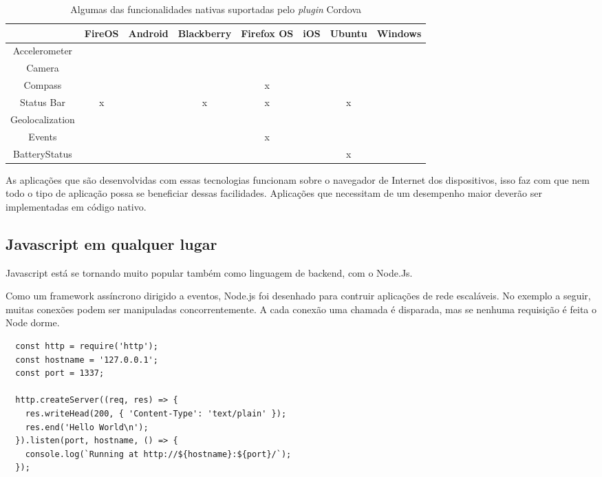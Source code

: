 \begin{table}[!htb]
	\small
	\centering
	\label{tab:cordova}
	\begin{tabular}{*8{c|}}
		 & \textbf{FireOS} & \textbf{Android} & \textbf{Blackberry} & \textbf{Firefox OS} & \textbf{iOS} & \textbf{Ubuntu} & \textbf{Windows}\\ \hline
		Accelerometer & \checkmark & \checkmark & \checkmark & \checkmark & \checkmark & \checkmark & \checkmark\\ \hline \SPACE
		Camera & \checkmark & \checkmark & \checkmark & \checkmark & \checkmark & \checkmark & \checkmark\\ \hline \SPACE
		Compass & \checkmark & \checkmark & \checkmark & x & \checkmark & \checkmark & \checkmark\\ \hline \SPACE
		Status Bar & x & \checkmark & x & x & \checkmark & x & \checkmark\\ \hline \SPACE
		Geolocalization & \checkmark & \checkmark & \checkmark & \checkmark & \checkmark & \checkmark & \checkmark\\ \hline \SPACE
		Events & \checkmark & \checkmark & \checkmark & x & \checkmark & \checkmark & \checkmark\\ \hline \SPACE
		BatteryStatus & \checkmark & \checkmark & \checkmark & \checkmark & \checkmark & x & \checkmark\\
		\hline
	\end{tabular}
	\caption[Funcionalidades nativas suportadas pelo \textit{plugin} Cordova]{Algumas das funcionalidades nativas suportadas pelo \textit{plugin} Cordova}
\end{table}

As aplicações que são desenvolvidas com essas tecnologias funcionam sobre o navegador de Internet dos dispositivos, isso faz com que nem todo o tipo de aplicação possa se beneficiar dessas facilidades. Aplicações que necessitam de um desempenho maior deverão ser implementadas em código nativo.

\subsection{Javascript em qualquer lugar}
Javascript está se tornando muito popular também como linguagem de backend, com o Node.Js.
\begin{citacao}
Como um framework assíncrono dirigido a eventos, Node.js foi desenhado para contruir aplicações de rede escaláveis. No exemplo a seguir, muitas conexões podem ser manipuladas concorrentemente. A cada conexão uma chamada é disparada, mas se nenhuma requisição é feita o Node dorme. \cite{nodejs}

\begin{verbatim}
  const http = require('http');
  const hostname = '127.0.0.1';
  const port = 1337;

  http.createServer((req, res) => {
    res.writeHead(200, { 'Content-Type': 'text/plain' });
    res.end('Hello World\n');
  }).listen(port, hostname, () => {
    console.log(`Running at http://${hostname}:${port}/`);
  });
\end{verbatim}
\end{citacao}

